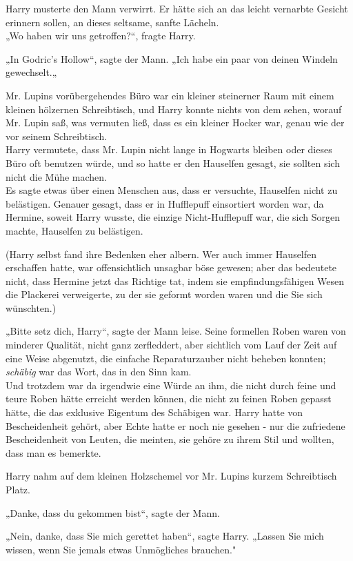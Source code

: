 {Harry musterte den Mann verwirrt. Er hätte sich an das leicht vernarbte Gesicht erinnern sollen, an dieses seltsame, sanfte Lächeln.\\ „Wo haben wir uns getroffen?“, fragte Harry.

„In Godric's Hollow“, sagte der Mann. „Ich habe ein paar von deinen Windeln gewechselt.„

Mr. Lupins vorübergehendes Büro war ein kleiner steinerner Raum mit einem kleinen hölzernen Schreibtisch, und Harry konnte nichts von dem sehen, worauf Mr. Lupin saß, was vermuten ließ, dass es ein kleiner Hocker war, genau wie der vor seinem Schreibtisch.\\ Harry vermutete, dass Mr. Lupin nicht lange in Hogwarts bleiben oder dieses Büro oft benutzen würde, und so hatte er den Hauselfen gesagt, sie sollten sich nicht die Mühe machen.\\ Es sagte etwas über einen Menschen aus, dass er versuchte, Hauselfen nicht zu belästigen. Genauer gesagt, dass er in Hufflepuff einsortiert worden war, da Hermine, soweit Harry wusste, die einzige Nicht-Hufflepuff war, die sich Sorgen machte, Hauselfen zu belästigen.

(Harry selbst fand ihre Bedenken eher albern. Wer auch immer Hauselfen erschaffen hatte, war offensichtlich unsagbar böse gewesen; aber das bedeutete nicht, dass Hermine jetzt das Richtige tat, indem sie empfindungsfähigen Wesen die Plackerei verweigerte, zu der sie geformt worden waren und die Sie sich wünschten.)

„Bitte setz dich, Harry“, sagte der Mann leise. Seine formellen Roben waren von minderer Qualität, nicht ganz zerfleddert, aber sichtlich vom Lauf der Zeit auf eine Weise abgenutzt, die einfache Reparaturzauber nicht beheben konnten; \emph{schäbig} war das Wort, das in den Sinn kam.\\ Und trotzdem war da irgendwie eine Würde an ihm, die nicht durch feine und teure Roben hätte erreicht werden können, die nicht zu feinen Roben gepasst hätte, die das exklusive Eigentum des Schäbigen war. Harry hatte von Bescheidenheit gehört, aber Echte hatte er noch nie gesehen - nur die zufriedene Bescheidenheit von Leuten, die meinten, sie gehöre zu ihrem Stil und wollten, dass man es bemerkte.

Harry nahm auf dem kleinen Holzschemel vor Mr. Lupins kurzem Schreibtisch Platz.

„Danke, dass du gekommen bist“, sagte der Mann.

„Nein, danke, dass Sie mich gerettet haben“, sagte Harry. „Lassen Sie mich wissen, wenn Sie jemals etwas Unmögliches brauchen."

}
